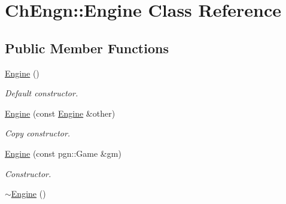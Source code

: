 \hypertarget{classChEngn_1_1Engine}{
\section{ChEngn::Engine Class Reference}
\label{classChEngn_1_1Engine}
}
\subsection*{Public Member Functions}
\begin{DoxyCompactItemize}
\item 
\hypertarget{classChEngn_1_1Engine_a2bd4b075e86d94d94f3ea97c680b302e}{
\hyperlink{classChEngn_1_1Engine_a2bd4b075e86d94d94f3ea97c680b302e}{Engine} ()}
\label{classChEngn_1_1Engine_a2bd4b075e86d94d94f3ea97c680b302e}

\begin{DoxyCompactList}\small\item\em Default constructor. \item\end{DoxyCompactList}\item 
\hyperlink{classChEngn_1_1Engine_ab92c015fc819dc2b7c51cccbc7878002}{Engine} (const \hyperlink{classChEngn_1_1Engine}{Engine} \&other)
\begin{DoxyCompactList}\small\item\em Copy constructor. \item\end{DoxyCompactList}\item 
\hyperlink{classChEngn_1_1Engine_a1184e133eae1f7e23bf405302fa9f53c}{Engine} (const pgn::Game \&gm)
\begin{DoxyCompactList}\small\item\em Constructor. \item\end{DoxyCompactList}\item 
\hypertarget{classChEngn_1_1Engine_a8c4cadb1d68d9f3f9ad5ca03d3353a34}{
\hyperlink{classChEngn_1_1Engine_a8c4cadb1d68d9f3f9ad5ca03d3353a34}{$\sim$Engine} ()}
\label{classChEngn_1_1Engine_a8c4cadb1d68d9f3f9ad5ca03d3353a34}


\end{DoxyCompactItemize}
